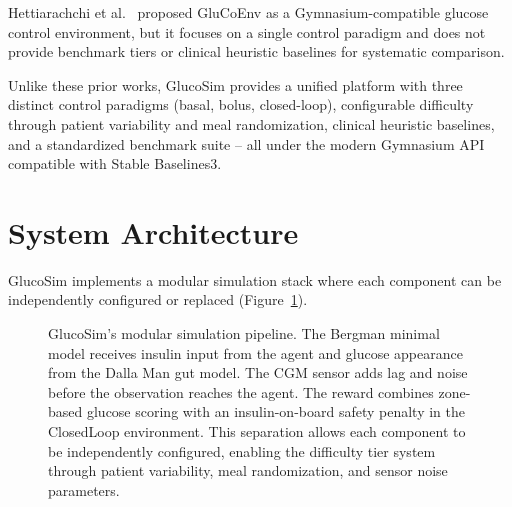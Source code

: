 \documentclass[11pt]{article}
\begin{document}
Hettiarachchi et al.~\citep{hettiarachchi2022glucoenv} proposed GluCoEnv as a Gymnasium-compatible glucose control environment, but it focuses on a single control paradigm and does not provide benchmark tiers or clinical heuristic baselines for systematic comparison.

Unlike these prior works, GlucoSim provides a unified platform with three distinct control paradigms (basal, bolus, closed-loop), configurable difficulty through patient variability and meal randomization, clinical heuristic baselines, and a standardized benchmark suite -- all under the modern Gymnasium API compatible with Stable Baselines3.

\section{System Architecture}

GlucoSim implements a modular simulation stack where each component can be independently configured or replaced (Figure~\ref{fig:architecture}).

\begin{figure}[h]
\centering
{}
\caption{GlucoSim's modular simulation pipeline. The Bergman minimal model receives insulin input from the agent and glucose appearance from the Dalla Man gut model. The CGM sensor adds lag and noise before the observation reaches the agent. The reward combines zone-based glucose scoring with an insulin-on-board safety penalty in the ClosedLoop environment. This separation allows each component to be independently configured, enabling the difficulty tier system through patient variability, meal randomization, and sensor noise parameters.}
\label{fig:architecture}
\end{figure}
\end{document}
